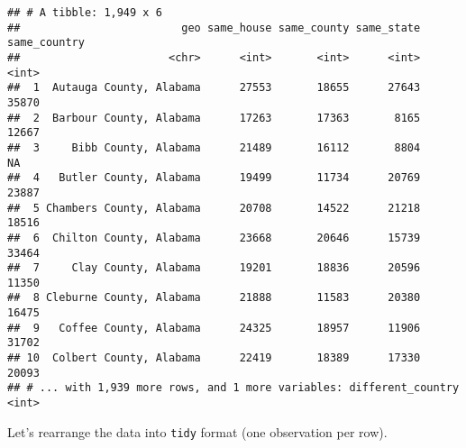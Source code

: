 \documentclass[]{book}
\newenvironment{Shaded}{\begin{snugshade}}{\end{snugshade}}
\newcommand{\KeywordTok}[1]{\textcolor[rgb]{0.13,0.29,0.53}{\textbf{{#1}}}}
\newcommand{\DataTypeTok}[1]{\textcolor[rgb]{0.13,0.29,0.53}{{#1}}}
\newcommand{\StringTok}[1]{\textcolor[rgb]{0.31,0.60,0.02}{{#1}}}
\newcommand{\OtherTok}[1]{\textcolor[rgb]{0.56,0.35,0.01}{{#1}}}
\newcommand{\NormalTok}[1]{{#1}}
\theoremstyle{definition}
\theoremstyle{definition}
\theoremstyle{remark}
\begin{document}
\begin{Shaded}
\end{Shaded}

\begin{verbatim}
## # A tibble: 1,949 x 6
##                         geo same_house same_county same_state same_country
##                       <chr>      <int>       <int>      <int>        <int>
##  1  Autauga County, Alabama      27553       18655      27643        35870
##  2  Barbour County, Alabama      17263       17363       8165        12667
##  3     Bibb County, Alabama      21489       16112       8804           NA
##  4   Butler County, Alabama      19499       11734      20769        23887
##  5 Chambers County, Alabama      20708       14522      21218        18516
##  6  Chilton County, Alabama      23668       20646      15739        33464
##  7     Clay County, Alabama      19201       18836      20596        11350
##  8 Cleburne County, Alabama      21888       11583      20380        16475
##  9   Coffee County, Alabama      24325       18957      11906        31702
## 10  Colbert County, Alabama      22419       18389      17330        20093
## # ... with 1,939 more rows, and 1 more variables: different_country <int>
\end{verbatim}

Let's rearrange the data into \texttt{tidy} format (one observation per
row).

\begin{Shaded}
\end{Shaded}
\end{document}
